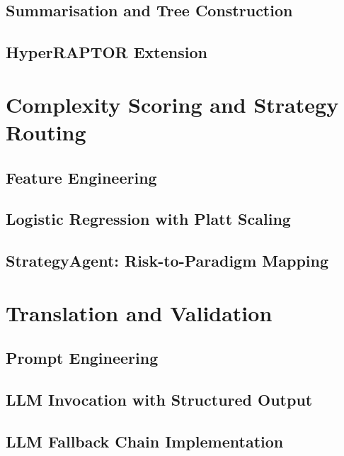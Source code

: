 \documentclass[12pt,a4paper]{report}
\begin{document}
  \subsection{Summarisation and Tree Construction}
  \label{subsec:summarizer-impl}

  \subsection{HyperRAPTOR Extension}
  \label{subsec:hyperraptor-impl}

\section{Complexity Scoring and Strategy Routing}
\label{sec:complexity-impl}

  \subsection{Feature Engineering}
  \label{subsec:feature-engineering}

  \subsection{Logistic Regression with Platt Scaling}
  \label{subsec:platt-impl}

  \subsection{StrategyAgent: Risk-to-Paradigm Mapping}
  \label{subsec:strategy-impl}

\section{Translation and Validation}
\label{sec:translation-impl}

  \subsection{Prompt Engineering}
  \label{subsec:prompt-engineering}

  \subsection{LLM Invocation with Structured Output}
  \label{subsec:llm-invocation}

  \subsection{LLM Fallback Chain Implementation}
  \label{subsec:fallback-impl}
\end{document}
